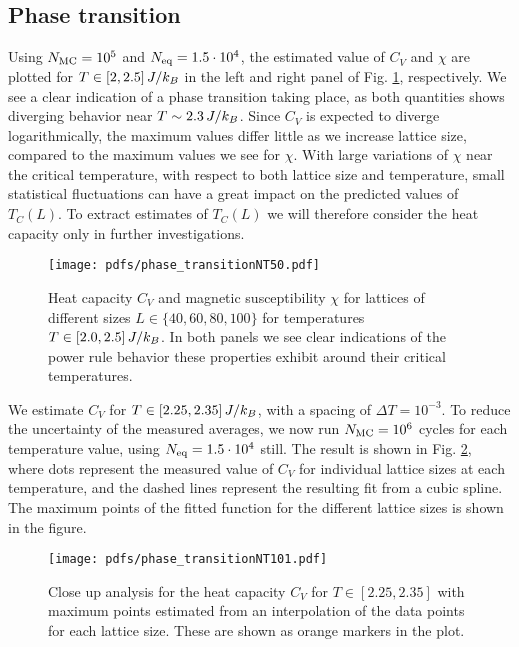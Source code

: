 \subsection{Phase transition}\label{subsec_results:phase_transition}
Using $N_\mathrm{MC}=10^5$ and $N_\mathrm{eq}=1.5\cdot10^4$, the estimated value of $C_V$ and $\chi$ are plotted for $T\in[2,2.5]\,J/k_B$ in the left and right panel of Fig. \ref{fig:phase_transition}, respectively. We see a clear indication of a phase transition taking place, as both quantities shows diverging behavior near $T\sim2.3\,J/k_B$. Since $C_V$ is expected to diverge logarithmically, the maximum values differ little as we increase lattice size, compared to the maximum values we see for $\chi$. With large variations of $\chi$ near the critical temperature, with respect to both lattice size and temperature, small statistical fluctuations can have a great impact on the predicted values of $T_C(L)$. To extract estimates of $T_C(L)$ we will therefore consider the heat capacity only in further investigations. 
\begin{figure*}[!ht]
    \texttt{[image: pdfs/phase\_transitionNT50.pdf]} 
    \caption{Heat capacity $C_V$ and magnetic susceptibility $\chi$ for lattices of different sizes $L\in\{40,60,80,100\}$ for temperatures $T\in[2.0,2.5]\,J/k_B$. In both panels we see clear indications of the power rule behavior these properties exhibit around their critical temperatures.}
    \label{fig:phase_transition}
\end{figure*} 

We estimate $C_V$ for $T\in[2.25,2.35]\,J/k_B$, with a spacing of $\Delta T=10^{-3}$. To reduce the uncertainty of the measured averages, we now run $N_\mathrm{MC}=10^6$ cycles for each temperature value, using $N_\mathrm{eq}=1.5\cdot10^4$ still. The result is shown in Fig. \ref{fig:phase_transition_zoomed}, where dots represent the measured value of $C_V$ for individual lattice sizes at each temperature, and the dashed lines represent the resulting fit from a cubic spline. The maximum points of the fitted function for the different lattice sizes is shown in the figure.    
\begin{figure}[!ht]
    \texttt{[image: pdfs/phase\_transitionNT101.pdf]} 
    \caption{Close up analysis for the heat capacity $C_V$ for $T\in[2.25, 2.35]$ with maximum points estimated from an interpolation of the data points for each lattice size. These are shown as orange markers in the plot.}
    \label{fig:phase_transition_zoomed}
\end{figure} 

